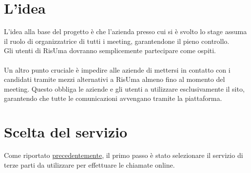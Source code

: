 \section{L'idea}
L'idea alla base del progetto è che l'azienda presso cui si è svolto lo stage assuma il ruolo di organizzatrice 
di tutti i meeting, garantendone il pieno controllo. 
\\
Gli utenti di RisUma dovranno semplicemente partecipare come ospiti.
\\
\\
Un altro punto cruciale è impedire alle aziende di mettersi in contatto con i candidati 
tramite mezzi alternativi a RisUma almeno fino al momento del meeting. Questo obbliga le aziende e gli utenti a 
utilizzare esclusivamente il sito, garantendo che tutte le comunicazioni avvengano tramite la piattaforma.

\section{Scelta del servizio}
Come riportato \hyperref[sec:scelta_del_servizo]{precedentemente}, il primo passo è stato selezionare il servizio di terze parti da utilizzare 
per effettuare le chiamate online.